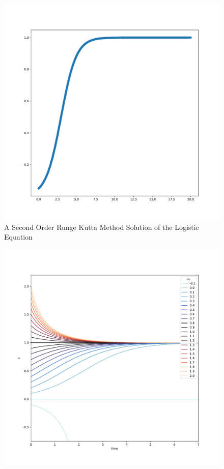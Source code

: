 \documentclass[a4paper,12pt]{article}
\begin{document}
\begin{figure}[!h]
  \centering
  \includegraphics[scale = 0.5]{1c.pdf}
  \caption{A Second Order Runge Kutta Method Solution of the Logistic Equation}
  \label{fig:eulerLogistic}
\end{figure}

\begin{figure}[!h]
  \centering
  \includegraphics[scale = 0.75]{2.pdf}
\end{figure}
\end{document}
